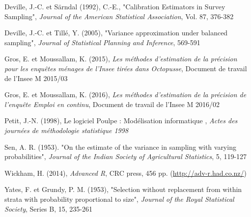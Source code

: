 \documentclass[12pt]{article}
\begin{document}
\noindent Deville, J.-C. et Särndal (1992), C.-E., "Calibration Estimators in Survey Sampling", \textit{Journal of the American Statistical Association}, Vol. 87, 376-382

\noindent Deville, J.-C. et Tillé, Y. (2005), "Variance approximation under balanced sampling", \textit{Journal of Statistical Planning and Inference}, 569-591

\noindent Gros, E. et Moussallam, K. (2015), \textit{Les méthodes d'estimation de la précision pour les enquêtes ménages de l'Insee tirées dans Octopusse}, Document de travail de l'Insee M 2015/03

\noindent Gros, E. et Moussallam, K. (2016), \textit{Les méthodes d'estimation de la précision de l'enquête Emploi en continu}, Document de travail de l'Insee M 2016/02

\noindent Petit, J.-N. (1998), \og Le logiciel Poulpe : Modélisation informatique \fg{}, \textit{Actes des journées de méthodologie statistique 1998}

\noindent Sen, A. R. (1953). "On the estimate of the variance in sampling with varying probabilities", \textit{Journal of the Indian Society of Agricultural Statistics}, 5, 119-127

\noindent Wickham, H. (2014), \textit{Advanced R}, CRC press, 456 pp. (\url{http://adv-r.had.co.nz/})

\noindent Yates, F. et Grundy, P. M. (1953), "Selection without replacement from within strata with probability proportional to size", \textit{Journal of the Royal Statistical Society}, Series B, 15, 235-261
\end{document}
